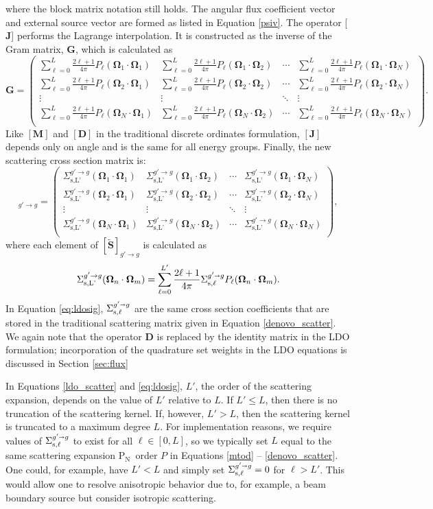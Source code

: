 \documentclass{article} %
\newcommand{\sa}{\shortrightarrow}
\newcommand{\bo}{\mathbf\Omega}
\newcommand{\pn}{P$_\mathrm{N}$}
\newcommand{\ve}[1]{\ensuremath{\mathbf{#1}}}
\newcommand{\Sigg}[1]{\ensuremath{\Sigma^{g'\sa g}_{\text{s},#1}}}
\newcommand{\Gij}[2]{\sum_{\ell=0}^L\frac{2\ell+1}{4\pi}P_{\ell}(\bo_#1\cdot\bo_#2)}
\newcommand{\Sij}[2]{\Sigma^{g'\rightarrow g}_{\text{s,L'}}(\bo_#1\cdot\bo_#2)}
\begin{document}
%
where the block matrix notation still holds. The angular flux
coefficient vector and external source vector are formed as listed in Equation
\eqref{psiv}. The operator [$\ve{J}$] performs the Lagrange interpolation. It is
constructed as the inverse of the Gram matrix, $\ve{G}$, which is calculated as
%
\begin{equation}
  \ve{G} = \begin{pmatrix}
    \Gij{1}{1} & \Gij{1}{2} & \cdots & \Gij{1}{N} \\
    \Gij{2}{1} & \Gij{2}{2} & \cdots & \Gij{2}{N} \\
    \vdots     & \vdots     & \ddots & \vdots     \\
    \Gij{N}{1} & \Gij{N}{2} & \cdots & \Gij{N}{N} \\
  \end{pmatrix}.
\label{gram}
\end{equation}
%
Like $[\ve{M}]$ and $[\ve{D}]$ in the traditional discrete ordinates
formulation, $[\ve{J}]$ depends only on angle and is the same for all 
energy groups. Finally, the new scattering cross section matrix is:
%
\begin{equation}
  [\ve{\tilde{S}}]_{g'\rightarrow g} = \begin{pmatrix}
    \Sij{1}{1} & \Sij{1}{2} & \cdots & \Sij{1}{N} \\
    \Sij{2}{1} & \Sij{2}{2} & \cdots & \Sij{2}{N} \\
    \vdots     & \vdots     & \ddots & \vdots     \\
    \Sij{N}{1} & \Sij{N}{2} & \cdots & \Sij{N}{N} \\
  \end{pmatrix},
\label{ldo_scatter}
\end{equation}
%
where each element of $[\ve{\tilde{S}}]_{g'\rightarrow g}$ is
calculated as
%
\begin{equation}
\Sij{n}{m} = \sum_{\ell=0}^{L'} \frac{2\ell +1}{4\pi}\Sigg{\ell}
P_{\ell}(\bo_n \cdot\bo_m).
\label{eq:ldosig}
\end{equation}
%
In Equation \eqref{eq:ldosig}, $\Sigg{\ell}$ are the same cross section 
coefficients that are stored in the traditional scattering matrix given in
Equation \eqref{denovo_scatter}. We again note that the operator $\ve{D}$ is
replaced by the identity matrix in the LDO formulation; incorporation of the
quadrature set weights in the LDO equations is 
discussed in Section \ref{sec:flux}\ 

In Equations \eqref{ldo_scatter} and \eqref{eq:ldosig}, $L'$, the order of the
scattering expansion, depends on the value of $L'$ relative to $L$. If 
$L'\le L$, then there is no truncation of the scattering kernel. If, however,
$L' > L$, then the scattering kernel is truncated to a maximum degree $L$. For
implementation reasons, we require values of $\Sigg{\ell}$ to exist for all
$\ell \in [0,L]$, so we typically set $L$ equal to the same scattering
expansion \pn\ order $P$ in Equations \eqref{mtod} -- \eqref{denovo_scatter}. One
could, for example, have $L' < L$ and simply set $\Sigg{\ell}=0$ for $\ell> L'$.
This would allow one to resolve anisotropic behavior due to, for example,
a beam boundary source but consider isotropic scattering.
\end{document}
